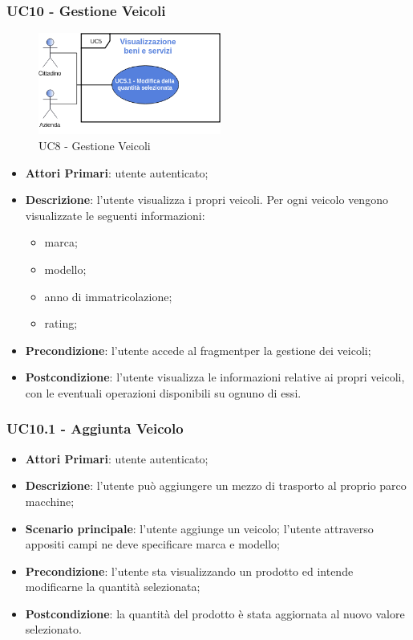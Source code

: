  \subsubsection{UC10 - Gestione Veicoli}
  \begin{figure}[H]
 	\includegraphics[width=6cm]{res/images/UC5-Generale.png}
 	\centering
 	\caption{UC8 - Gestione Veicoli}
 \end{figure}
 \begin{itemize}
 	\item \textbf{Attori Primari}: utente autenticato;
 	\item \textbf{Descrizione}: l'utente visualizza i propri veicoli. Per ogni veicolo vengono visualizzate le seguenti informazioni:
 	\begin{itemize}
 		\item marca;
 		\item modello;
 		\item anno di immatricolazione;
 		\item rating;
 	\end{itemize}
 	\item \textbf{Precondizione}: l'utente accede al fragment\glosp per la gestione dei veicoli;
 	\item \textbf{Postcondizione}: l'utente visualizza le informazioni relative ai propri veicoli, con le eventuali operazioni disponibili su ognuno di essi.
 \end{itemize}
 \subsubsection{UC10.1 - Aggiunta Veicolo}
 \begin{itemize}
 	\item \textbf{Attori Primari}: utente autenticato;
 	\item \textbf{Descrizione}: l'utente può aggiungere un mezzo di trasporto al proprio parco macchine;
 	\item \textbf{Scenario principale}: l'utente aggiunge un veicolo; l'utente attraverso appositi campi ne deve specificare marca e modello;
 	\item \textbf{Precondizione}: l'utente sta visualizzando un prodotto ed intende modificarne la quantità selezionata;
 	\item \textbf{Postcondizione}: la quantità del prodotto è stata aggiornata al nuovo valore selezionato.
 \end{itemize}